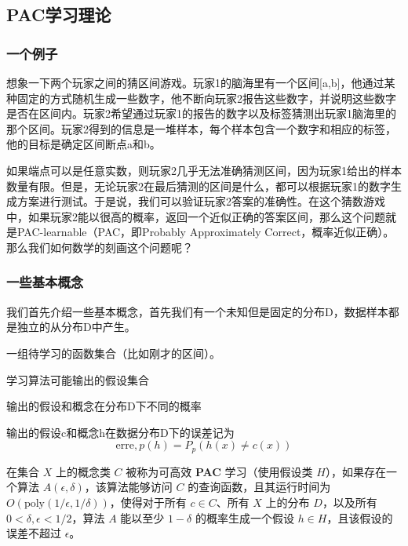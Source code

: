 \documentclass[lang=cn,newtx,10pt,scheme=chinese,chinesefont=nofont,citestyle=gb7714-2015, bibstyle=gb7714-2015]{elegantbook}
\begin{document}
\begin{refsection}
\subsection{PAC学习理论}
\subsubsection{一个例子}
想象一下两个玩家之间的猜区间游戏。玩家1的脑海里有一个区间[a,b]，他通过某种固定的方式随机生成一些数字，他不断向玩家2报告这些数字，并说明这些数字是否在区间内。玩家2希望通过玩家1的报告的数字以及标签猜测出玩家1脑海里的那个区间。玩家2得到的信息是一堆样本，每个样本包含一个数字和相应的标签，他的目标是确定区间断点a和b。

如果端点可以是任意实数，则玩家2几乎无法准确猜测区间，因为玩家1给出的样本数量有限。但是，无论玩家2在最后猜测的区间是什么，都可以根据玩家1的数字生成方案进行测试。于是说，我们可以验证玩家2答案的准确性。在这个猜数游戏中，如果玩家2能以很高的概率，返回一个近似正确的答案区间，那么这个问题就是PAC-learnable（PAC，即Probably Approximately Correct，概率近似正确）。\\
那么我们如何数学的刻画这个问题呢？
\subsubsection{一些基本概念}
我们首先介绍一些基本概念，首先我们有一个未知但是固定的分布D，数据样本都是独立的从分布D中产生。
\begin{definition}
一组待学习的函数集合（比如刚才的区间）。
\end{definition}
\begin{definition}
学习算法可能输出的假设集合
\end{definition}
\begin{definition}[误差]
输出的假设和概念在分布D下不同的概率
\end{definition}
输出的假设c和概念h在数据分布D下的误差记为
\[ \text{erre}, p(h) = P_p(h(x) \neq c(x)) \]

\begin{definition}
    在集合 \( X \) 上的概念类 \( C \) 被称为可高效 \textbf{PAC} 学习（使用假设类 \( H \)），如果存在一个算法 \( A(\epsilon, \delta) \)，该算法能够访问 \( C \) 的查询函数，且其运行时间为 \( O(\text{poly}(1/\epsilon, 1/\delta)) \)，使得对于所有 \( c \in C \)、所有 \( X \) 上的分布 \( D \)，以及所有 \( 0 < \delta, \epsilon < 1/2 \)，算法 \( A \) 能以至少 \( 1 - \delta \) 的概率生成一个假设 \( h \in H \)，且该假设的误差不超过 \(\epsilon\)。


\end{definition}
\end{refsection}
\end{document}
